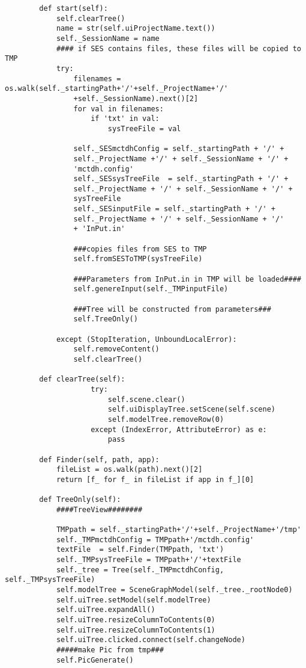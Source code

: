 \begin{verbatim}
        def start(self):
            self.clearTree()
            name = str(self.uiProjectName.text())
            self._SessionName = name
            #### if SES contains files, these files will be copied to TMP
            try:
                filenames = os.walk(self._startingPath+'/'+self._ProjectName+'/'
                +self._SessionName).next()[2]
                for val in filenames:
                    if 'txt' in val:
                        sysTreeFile = val
    
                self._SESmctdhConfig = self._startingPath + '/' + 
                self._ProjectName +'/' + self._SessionName + '/' + 
                'mctdh.config'
                self._SESsysTreeFile  = self._startingPath + '/' + 
                self._ProjectName + '/' + self._SessionName + '/' + 
                sysTreeFile
                self._SESinputFile = self._startingPath + '/' + 
                self._ProjectName + '/' + self._SessionName + '/' 
                + 'InPut.in'
    
                ###copies files from SES to TMP
                self.fromSESToTMP(sysTreeFile)
    
                ###Parameters from InPut.in in TMP will be loaded####
                self.genereInput(self._TMPinputFile)
    
                ###Tree will be constructed from parameters###
                self.TreeOnly()
    
            except (StopIteration, UnboundLocalError):
                self.removeContent()
                self.clearTree()
        
        def clearTree(self):
                    try:
                        self.scene.clear()
                        self.uiDisplayTree.setScene(self.scene)
                        self.modelTree.removeRow(0)
                    except (IndexError, AttributeError) as e:
                        pass
    
        def Finder(self, path, app):
            fileList = os.walk(path).next()[2]
            return [f_ for f_ in fileList if app in f_][0]
    
        def TreeOnly(self):
            ####TreeView########
    
            TMPpath = self._startingPath+'/'+self._ProjectName+'/tmp'
            self._TMPmctdhConfig = TMPpath+'/mctdh.config'  
            textFile  = self.Finder(TMPpath, 'txt')
            self._TMPsysTreeFile = TMPpath+'/'+textFile 
            self._tree = Tree(self._TMPmctdhConfig, self._TMPsysTreeFile)
            self.modelTree = SceneGraphModel(self._tree._rootNode0)
            self.uiTree.setModel(self.modelTree)
            self.uiTree.expandAll()
            self.uiTree.resizeColumnToContents(0)
            self.uiTree.resizeColumnToContents(1)
            self.uiTree.clicked.connect(self.changeNode)
            #####make Pic from tmp###
            self.PicGenerate()
    

\end{verbatim}
